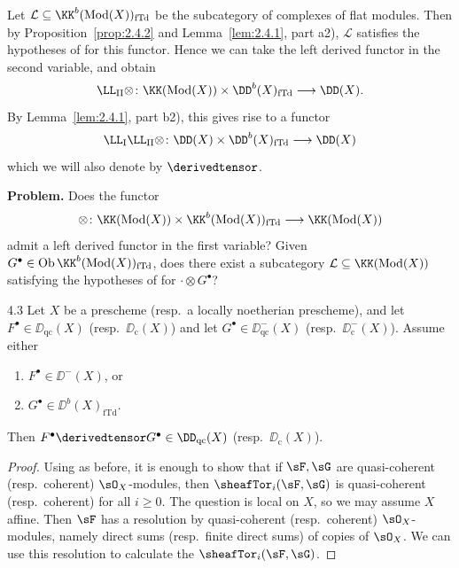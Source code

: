 Let $\mathcal{L}\subseteq\KK^b(\operatorname{Mod}(X))_{\mathrm{fTd}}$ be the subcategory of complexes of flat modules. Then by Proposition~\ref{prop:2.4.2} and Lemma~\ref{lem:2.4.1}, part a2), $\mathcal{L}$ satisfies the hypotheses of  for this functor. Hence we can take the left derived functor in the second variable, and obtain
\[
\LL_{\mathrm{II}}\otimes\colon \KK(\operatorname{Mod}(X)) \times \DD^b(X)_{\mathrm{fTd}} \longrightarrow \DD(X).
\]
By Lemma~\ref{lem:2.4.1}, part b2), this gives rise to a functor
\[
\LL_{\mathrm{I}}\LL_{\mathrm{II}}\otimes\colon \DD(X) \times \DD^b(X)_{\mathrm{fTd}} \longrightarrow \DD(X)
\]
which we will also denote by $\derivedtensor$.

\medskip

\textbf{Problem.}
Does the functor
\[
\otimes\colon \KK(\operatorname{Mod}(X)) \times \KK^b(\operatorname{Mod}(X))_{\mathrm{fTd}} \longrightarrow \KK(\operatorname{Mod}(X))
\]
admit a left derived functor in the first variable? Given $G^\bullet\in\operatorname{Ob}\KK^b(\operatorname{Mod}(X))_{\mathrm{fTd}}$, does there exist a subcategory $\mathcal{L}\subseteq\KK(\operatorname{Mod}(X))$ satisfying the hypotheses of  for $\cdot\otimes G^\bullet$?

\begin{bookproposition}{4.3}\label{prop:2.4.4}
Let $X$ be a prescheme (resp.\ a locally noetherian prescheme), and let $F^\bullet\in\DD_{\mathrm{qc}}(X)$ (resp.\ $\DD_{\mathrm{c}}(X)$) and let $G^\bullet\in\DD_{\mathrm{qc}}^-(X)$ (resp.\ $\DD_{\mathrm{c}}^-(X)$). Assume either
\begin{enumerate}
\item[a)] $F^\bullet\in\DD^-(X)$, or
\item[b)] $G^\bullet\in\DD^b(X)_{\mathrm{fTd}}$.
\end{enumerate}
Then $F^\bullet\derivedtensor G^\bullet\in\DD_{\mathrm{qc}}(X)$ (resp.\ $\DD_{\mathrm{c}}(X)$).
\end{bookproposition}

\begin{proof}
Using  as before, it is enough to show that if $\sF,\sG$ are quasi-coherent (resp.\ coherent) $\sO_X$-modules, then $\sheafTor_i(\sF,\sG)$ is quasi-coherent (resp.\ coherent) for all $i\ge 0$. The question is local on $X$, so we may assume $X$ affine. Then $\sF$ has a resolution by quasi-coherent (resp.\ coherent) $\sO_X$-modules, namely direct sums (resp.\ finite direct sums) of copies of $\sO_X$. We can use this resolution to calculate the $\sheafTor_i(\sF,\sG)$.
\end{proof}

